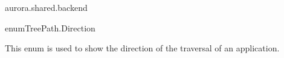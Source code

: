 \begin{texdocpackage}{aurora.shared.backend}
\begin{texdocclass}{enum}{TreePath.Direction}
\label{texdoclet:aurora.shared.backend.TreePath.Direction}
\begin{texdocclassintro}
This enum is used to show the direction of the traversal of an application.\end{texdocclassintro}
\begin{texdocenums}
\end{texdocenums}
\begin{texdocclassmethods}
\end{texdocclassmethods}
\end{texdocclass}


\end{texdocpackage}



